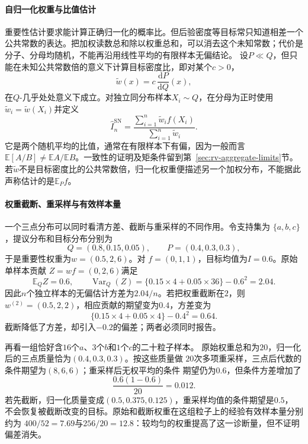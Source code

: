 \paragraph{自归一化权重与比值估计}
重要性估计要求能计算正确归一化的概率比。但后验密度等目标常只知道相差一个公共常数的表达。把加权读数总和除以权重总和，可以消去这个未知常数；代价是分子、分母均随机，不能再沿用线性平均的有限样本无偏结论。
设\(P\ll Q\)，但只能在未知公共常数倍的意义下计算目标密度比，即对某个\(c>0\)，
\[
  \widetilde{w}(x)
  =
  c\,\frac{\mathrm{d}P}{\mathrm{d}Q}(x),
\]
在\(Q\)-几乎处处意义下成立。对独立同分布样本\(X_i\sim Q\)，在分母为正时使用
\(\widetilde{w}_i=\widetilde{w}(X_i)\)并定义
\begin{equation}
  \widehat{I}^{\mathrm{SN}}_n
  =
  \frac{\sum_{i=1}^{n}\widetilde{w}_if(X_i)}
       {\sum_{i=1}^{n}\widetilde{w}_i}.
  \label{eq:probability-self-normalized-importance-sampling}
\end{equation}
它是两个随机平均的比值，通常在有限样本下有偏，因为一般而言
\(\mathbb E[A/B]\ne\mathbb EA/\mathbb EB\)。一致性的证明及矩条件留到第~\ref{sec:rv-aggregate-limits}节。
若\(\widetilde w\)不是目标密度比的公共常数倍，归一化权重便描述另一个加权分布，不能据此声称估计的是\(\mathbb E_Pf\)。

\paragraph{权重截断、重采样与有效样本量}
一个三点分布可以同时看清方差、截断与重采样的不同作用。令支持集为
\(\{a,b,c\}\)，提议分布和目标分布分别为
\[
  Q=(0.8,0.15,0.05),\qquad
  P=(0.4,0.3,0.3),
\]
于是重要性权重为\(w=(0.5,2,6)\)。对
\(f=(0,1,1)\)，目标均值为\(I=0.6\)。原始单样本贡献
\(Z=wf=(0,2,6)\)满足
\[
  \mathbb{E}_Q Z=0.6,\qquad
  \operatorname{Var}_Q(Z)
  =\{0.15\times4+0.05\times36\}-0.6^2
  =2.04.
\]
因此\(n\)个独立样本的无偏估计方差为\(2.04/n\)。若把权重截断在\(2\)，则
\(w^{(2)}=(0.5,2,2)\)，相应贡献的期望变为\(0.4\)，方差变为
\[
  \{0.15\times4+0.05\times4\}-0.4^2=0.64.
\]
截断降低了方差，却引入\(-0.2\)的偏差；两者必须同时报告。

再看一组恰好含\(16\)个\(a\)、\(3\)个\(b\)和\(1\)个\(c\)的二十粒子样本。
原始权重总和为\(20\)，归一化后的三点质量恰为\((0.4,0.3,0.3)\)。按这些质量做
\(20\)次多项重采样，三点后代数的条件期望为\((8,6,6)\)；重采样后无权平均的条件
期望仍为\(0.6\)，但条件方差增加了
\[
  \frac{0.6(1-0.6)}{20}=0.012.
\]
若先截断，归一化质量变成\((0.5,0.375,0.125)\)，重采样均值的条件期望是\(0.5\)，
不会恢复被截断改变的目标。原始和截断权重在这组粒子上的经验有效样本量分别约为
\(400/52=7.69\)与\(256/20=12.8\)：较均匀的权重提高了这一诊断量，但不证明偏差消失。

